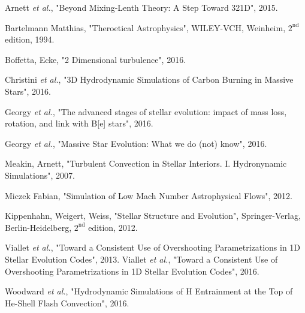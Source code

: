 

\begin{thebibliography}{9}
	
		Arnett \emph{et al.},
		  "Beyond Mixing-Lenth Theory: A Step Toward 321D",
			  2015.


		  Bartelmann Matthias,
		  "Theroetical Astrophysics",
		      WILEY-VCH, Weinheim,
		      $\mathrm{2^{nd}}$ edition,
			  1994.

		Boffetta, Ecke,
		  "2 Dimensional turbulence",
			  2016.
	
		Christini \emph{et al.},
		  "3D Hydrodynamic Simulations of Carbon Burning in Massive Stars",
			  2016.

	
		Georgy \emph{et al.},
		"The advanced stages of stellar evolution: impact of mass loss, rotation, and link with B[e] stars",
			  2016.

		Georgy \emph{et al.},
		"Massive Star Evolution: What we do (not) know",
			  2016.

		  Meakin, Arnett,
		  "Turbulent Convection in Stellar Interiors. I. Hydronynamic Simulations",
			  2007.

		Miczek Fabian,
		  "Simulation of Low Mach Number Astrophysical Flows",
			  2012.


	
		  Kippenhahn, Weigert, Weiss,
		  "Stellar Structure and Evolution",
		      Springer-Verlag, Berlin-Heidelberg,
		        $\mathrm{2^{nd}}$ edition,
			  2012.

		Viallet \emph{et al.},
		  "Toward a Consistent Use of Overshooting Parametrizations in 1D Stellar Evolution Codes",
			  2013.
		Viallet \emph{et al.},
		  "Toward a Consistent Use of Overshooting Parametrizations in 1D Stellar Evolution Codes",
			  2016.

		Woodward \emph{et al.},
		  "Hydrodynamic Simulations of H Entrainment at the Top of He-Shell Flash Convection",
			  2016.
\end{thebibliography}
